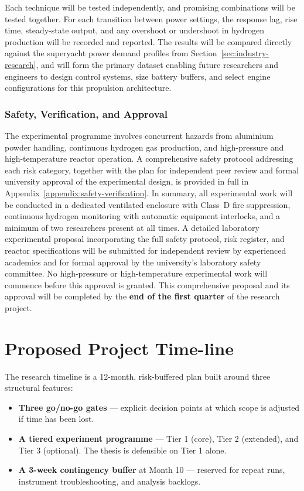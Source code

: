 \documentclass[12pt]{article}
\begin{document}
Each technique will be tested independently, and promising combinations will be 
tested together. For each transition between power settings, the response lag, rise 
time, steady-state output, and any overshoot or undershoot in hydrogen production 
will be recorded and reported. The results will be compared directly against the 
superyacht power demand profiles from Section~\ref{sec:industry-research}, and 
will form the primary dataset enabling future researchers and engineers to design 
control systems, size battery buffers, and select engine configurations for this 
propulsion architecture.

\subsubsection*{Safety, Verification, and Approval}

The experimental programme involves concurrent hazards from aluminium powder 
handling, continuous hydrogen gas production, and high-pressure and high-temperature 
reactor operation. A comprehensive safety protocol addressing each risk category, 
together with the plan for independent peer review and formal university approval 
of the experimental design, is provided in full in 
Appendix~\ref{appendix:safety-verification}. In summary, all experimental work will 
be conducted in a dedicated ventilated enclosure with Class~D fire suppression, 
continuous hydrogen monitoring with automatic equipment interlocks, and a minimum 
of two researchers present at all times. A detailed laboratory experimental proposal 
incorporating the full safety protocol, risk register, and reactor specifications 
will be submitted for independent review by experienced academics and for formal 
approval by the university's laboratory safety committee. No high-pressure or 
high-temperature experimental work will commence before this approval is granted. 
This comprehensive proposal and its approval will be completed by the \textbf{end 
of the first quarter} of the research project.

\break

\section{Proposed Project Time-line}

The research timeline is a 12-month, risk-buffered plan built around three
structural features:

\begin{itemize}
    \item \textbf{Three go/no-go gates} --- explicit decision points at which scope is adjusted
          if time has been lost.
    \item \textbf{A tiered experiment programme} --- Tier 1 (core), Tier 2 (extended), and
          Tier 3 (optional). The thesis is defensible on Tier 1 alone.
    \item \textbf{A 3-week contingency buffer} at Month 10 --- reserved for repeat runs,
          instrument troubleshooting, and analysis backlogs.
\end{itemize}
\end{document}
